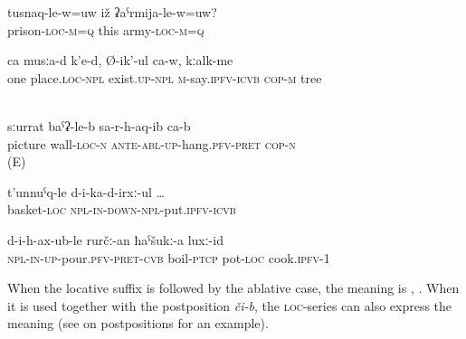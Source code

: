 %
\begin{exe}
	\ex	\label{ex:Is he in prison or in the army}
	\gll	tusnaq-le-w=uw	iž	ʡaˁrmija-le-w=uw? \\
		prison-\textsc{loc}-\textsc{m}=\textsc{q}	this		army-\textsc{loc}-\textsc{m}=\textsc{q}\\
	\glt	{}

	\ex	\label{ex:In once place, there are}
	\gll	ca	musːa-d	k'e-d,	Ø-ik'-ul ca-w,	kːalk-me\\
		one	place.\textsc{loc}-\textsc{npl}	exist.\textsc{up-npl}	\textsc{m}-say.\textsc{ipfv}-\textsc{icvb} \textsc{cop-m}	tree\\
	\glt	‎‎

	\ex	\label{ex:pic on wall_1}
	\gll	sːurrat baˁʡ-le-b sa-r-h-aq-ib ca-b\\
picture	wall-\textsc{loc-n}	\textsc{ante-abl-up}-hang.\textsc{pfv-pret}	\textsc{cop-n} \\
	\glt	{} (E)
	
	\ex	\label{ex:putting (the pears) into a basket}
	\gll	t'unnuˁq-le	d-i-ka-d-irxː-ul	\ldots\\
		basket-\textsc{loc} \textsc{npl-in-down}-\textsc{npl}-put.\textsc{ipfv}-\textsc{icvb}\\
	\glt	{}

	\ex	\label{ex:We pour (the xinkal) into a pot with boiling (water) and cook it}
	\gll	d-i-h-ax-ub-le	rurčː-an	ħaˁšukː-a	luxː-id\\
		\textsc{npl-in-up}-pour.\textsc{pfv}-\textsc{pret}-\textsc{cvb}	boil-\textsc{ptcp}	pot-\textsc{loc}		cook.\textsc{ipfv}-1\\
	\glt	{}
\end{exe}

When the locative suffix is followed by the ablative case, the meaning is  , . When it is used together with the postposition \textit{či-b}, the \textsc{loc}-series can also express the meaning  (see  on postpositions for an example).


